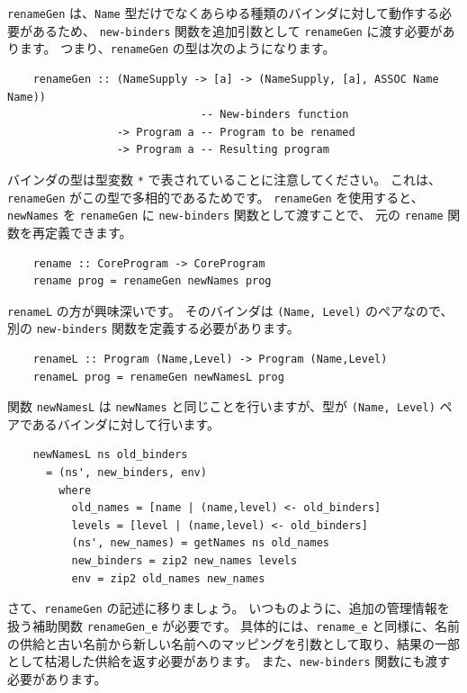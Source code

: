 \documentclass{jbook}
\begin{document}
\texttt{renameGen} は、\texttt{Name} 型だけでなくあらゆる種類のバインダに対して動作する必要があるため、
\texttt{new-binders} 関数を追加引数として \texttt{renameGen} に渡す必要があります。
つまり、\texttt{renameGen} の型は次のようになります。

\begin{verbatim}
	renameGen :: (NameSupply -> [a] -> (NameSupply, [a], ASSOC Name Name))
	                          -- New-binders function
	             -> Program a -- Program to be renamed
	             -> Program a -- Resulting program
\end{verbatim}

バインダの型は型変数 \texttt{*} で表されていることに注意してください。
これは、\texttt{renameGen} がこの型で多相的であるためです。
\texttt{renameGen} を使用すると、\texttt{newNames} を \texttt{renameGen} に \texttt{new-binders} 関数として渡すことで、
元の \texttt{rename} 関数を再定義できます。

\begin{verbatim}
	rename :: CoreProgram -> CoreProgram
	rename prog = renameGen newNames prog
\end{verbatim}

\texttt{renameL} の方が興味深いです。
そのバインダは \texttt{(Name, Level)} のペアなので、別の \texttt{new-binders} 関数を定義する必要があります。

\begin{verbatim}
	renameL :: Program (Name,Level) -> Program (Name,Level)
	renameL prog = renameGen newNamesL prog
\end{verbatim}

関数 \texttt{newNamesL} は \texttt{newNames} と同じことを行いますが、型が \texttt{(Name, Level)} ペアであるバインダに対して行います。

\begin{verbatim}
	newNamesL ns old_binders
	  = (ns', new_binders, env)
	    where
	      old_names = [name | (name,level) <- old_binders]
	      levels = [level | (name,level) <- old_binders]
	      (ns', new_names) = getNames ns old_names
	      new_binders = zip2 new_names levels
	      env = zip2 old_names new_names
\end{verbatim}

さて、\texttt{renameGen} の記述に移りましょう。
いつものように、追加の管理情報を扱う補助関数 \texttt{renameGen\_e} が必要です。
具体的には、\texttt{rename\_e} と同様に、名前の供給と古い名前から新しい名前へのマッピングを引数として取り、結果の一部として枯渇した供給を返す必要があります。
また、\texttt{new-binders} 関数にも渡す必要があります。
\end{document}
